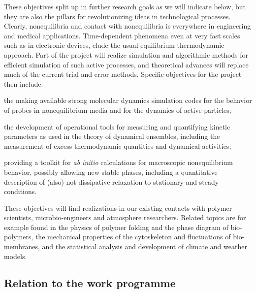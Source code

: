 These objectives split up in further research goals as we will indicate below, but they are also the pillars for revolutionizing ideas in technological processes.  Clearly, nonequilibria and contact with nonequilibria is everywhere in engineering and medical applications.  Time-dependent phenomena even at very fast scales such as in electronic devices, elude the usual equilibrium thermodynamic approach. Part of the project will realize simulation and algorithmic methods for efficient simulation of such active processes, and theoretical advances will replace much of the current trial and error methods.
Specific objectives for the project then include:
\begin{inparaenum}[A.]
\item the making available strong molecular dynamics simulation codes for the behavior of
  probes in nonequilibrium media and for the dynamics of active particles;
\item the development of operational tools for measuring and quantifying kinetic parameters
  as used in the theory of dynamical ensembles, including the measurement of excess
  thermodynamic quantities and dynamical activities;
\item providing a toolkit for {\it ab initio} calculations for macroscopic nonequilibrium
  behavior, possibly allowing new stable phases, including a quantitative description of
  (also) not-dissipative relaxation to stationary and steady conditions.
\end{inparaenum}
These objectives will find realizations in our existing contacts with polymer scientists,
microbio-engineers and atmosphere researchers. Related topics are for example found in the
physics of polymer folding and the phase diagram of bio-polymers, the mechanical properties
of the cytoskeleton and fluctuations of bio-membranes, and the statistical analysis and
development of climate and weather models.

\subsection{Relation to the work programme}\label{sec:relation-wp}


